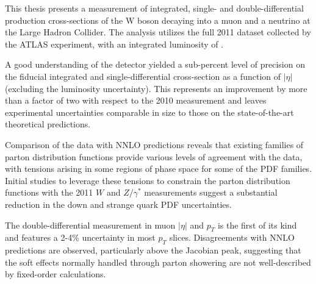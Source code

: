 This thesis presents a measurement of integrated, single- and double-differential production cross-sections of the W boson decaying into a muon and a neutrino at the Large Hadron Collider. The analysis utilizes the full 2011 dataset collected by the ATLAS experiment, with an integrated luminosity of \lumitr.

A good understanding of the detector yielded a sub-percent level of precision on the fiducial integrated and single-differential cross-section as a function of $|\eta|$ (excluding the luminosity uncertainty). This represents an improvement by more than a factor of two with respect to the 2010 measurement and leaves experimental uncertainties comparable in size to those on the state-of-the-art theoretical predictions.

Comparison of the data with NNLO predictions reveals that existing families of parton distribution functions provide various levels of agreement with the data, with tensions arising in some regions of phase space for some of the PDF families. Initial studies to leverage these tensions to constrain the parton distribution functions with the 2011 $W$ and $Z/\gamma^{*}$ measurements suggest a substantial reduction in the down and strange quark PDF uncertainties.

The double-differential measurement in muon $|\eta|$ and $p_T$ is the first of its kind and features a 2-4\% uncertainty in most $p_T$ slices. Disagreements with NNLO predictions are observed, particularly above the Jacobian peak, suggesting that the soft effects normally handled through parton showering are not well-described by fixed-order calculations.
